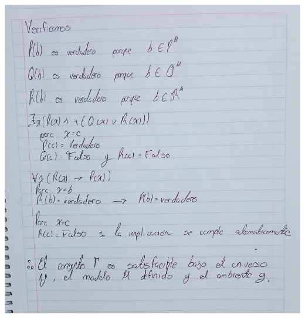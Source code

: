 \documentclass[12pt,letterpaper]{article}
\begin{document}
\begin{enumerate}
  \begin{center}
    \hspace{-1.2cm} \includegraphics[width=\textwidth,height=1.1\textheight,keepaspectratio]{ejercicio6b.png}
  \end{center}
  
\end{enumerate}
\end{document}
